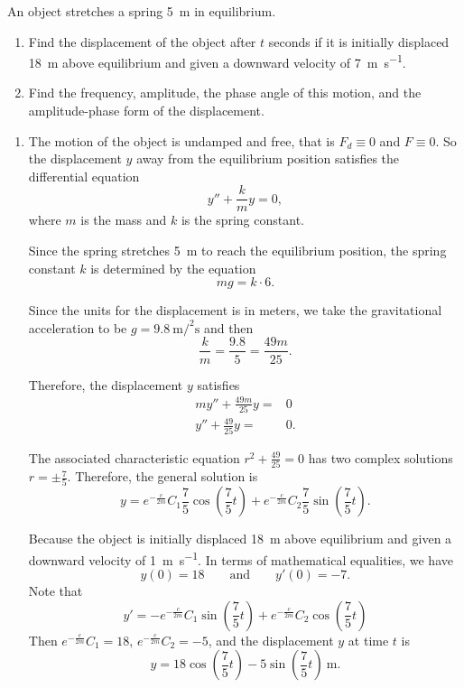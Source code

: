 \begin{example}
An object stretches a spring \SI{5}{\meter} in equilibrium.
\begin{enumerate}
  \item 
  Find the displacement of the object after $t$ seconds if it is initially displaced \SI{18}{\meter} above equilibrium and given a downward velocity of \SI{7}{\meter\per\second}.
  \item Find the frequency, amplitude, the phase angle of this motion, and the amplitude-phase form of the displacement.
\end{enumerate}
\end{example}
\begin{solution}
  \begin{enumerate}
    \item 
  The motion of the object is undamped and free, that is $F_d\equiv 0$ and $F\equiv 0$. So the displacement $y$ away from the equilibrium position satisfies the differential equation
  \[y''+\frac{k}{m}y=0,\]
  where $m$ is the mass and $k$ is the spring constant.

  Since the spring stretches \SI{5}{\meter} to reach the equilibrium position, the spring constant $k$ is determined by the equation
  \[mg=k\cdot 6.\]

  Since the units for the displacement is in meters, we take the gravitational acceleration to be $g=\SI{9.8}{\meter\square\per\second}$ and then
  \[\frac{k}{m}=\frac{9.8}{5}=\frac{49m}{25}.\]

  Therefore, the displacement $y$ satisfies
  \[
  \begin{aligned}
    my''+\frac{49m}{25}y=&0\\
    y''+\frac{49}{25}y=&0.
  \end{aligned}  
  \]

The associated characteristic equation $r^2+\frac{49}{25}=0$ has two complex solutions $r=\pm\frac{7}{5}$. Therefore, the general solution is
\[y=e^{-\frac{c}{2m}}C_1\frac{7}{5}\cos\left(\frac{7}{5}t\right)+e^{-\frac{c}{2m}}C_2\frac{7}{5}\sin\left(\frac{7}{5}t\right).\]

Because the object is initially displaced \SI{18}{\meter} above equilibrium and given a downward velocity of \SI{1}{\meter\per\second}. In terms of mathematical equalities, we have
\[y(0)=18\qquad\text{and}\qquad y'(0)=-7.\]
Note that 
\[y'=-e^{-\frac{c}{2m}}C_1\sin\left(\frac{7}{5}t\right)+e^{-\frac{c}{2m}}C_2\cos\left(\frac{7}{5}t\right)\]
Then $e^{-\frac{c}{2m}}C_1=18$, $e^{-\frac{c}{2m}}C_2=-5$, and the displacement $y$ at time $t$ is
\[y=18\cos\left(\frac{7}{5}t\right)-5\sin\left(\frac{7}{5}t\right)~ \si{\meter}.\]


\end{enumerate}
\end{solution}
